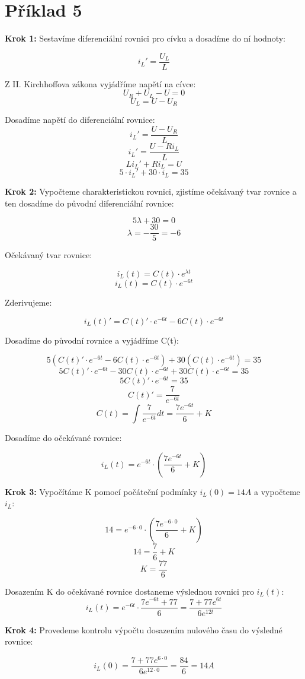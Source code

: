 \section{Příklad 5}

\textbf{Krok 1:} Sestavíme diferenciální rovnici pro cívku a dosadíme do ní hodnoty:

\[ i_{L}' = \frac{U_{L}}{L} \]

Z II. Kirchhoffova zákona vyjádříme napětí na cívce:
\[ U_{R} + U_{L} - U = 0 \]
\[ U_{L} = U - U_{R} \]

Dosadíme napětí do diferenciální rovnice:
\[ i_{L}' = \frac{U - U_{R}}{L} \]
\[ i_{L}' = \frac{U - R i_{L}}{L} \]
\[ L i_{L}' + R i_{L} = U \]
\[ 5 \cdot i_{L}' + 30 \cdot i_{L}  = 35 \]

\textbf{Krok 2:} Vypočteme charakteristickou rovnici, zjistíme očekávaný tvar rovnice a ten dosadíme do původní diferenciální rovnice:

\[ 5\lambda + 30 = 0 \]
\[ \lambda = -\frac{30}{5} = -6 \]

Očekávaný tvar rovnice:

\[ i_{L}(t) = C(t) \cdot e^{\lambda t} \]
\[ i_{L}(t) = C(t) \cdot e^{-6 t} \]

Zderivujeme:

\[ i_{L}(t)' = C(t)' \cdot e^{-6 t} - 6 C(t) \cdot e^{-6 t} \]

Dosadíme do původní rovnice a vyjádříme C(t):

\[ 5(C(t)' \cdot e^{-6 t} - 6 C(t) \cdot e^{-6 t}) + 30(C(t) \cdot e^{-6 t}) = 35 \]
\[ 5C(t)' \cdot e^{-6 t} - 30C(t) \cdot e^{-6 t} + 30C(t) \cdot e^{-6 t} = 35 \]
\[ 5C(t)' \cdot e^{-6 t} = 35 \]
\[ C(t)' = \frac{7}{e^{-6 t}} \]
\[ C(t) = \int \frac{7}{e^{-6 t}} dt = \frac{7e^{-6 t}}{6} + K\]

Dosadíme do očekávané rovnice:

\[ i_{L}(t) = e^{-6 t} \cdot \left(\frac{7e^{-6 t}}{6} + K \right)\]

\textbf{Krok 3:} Vypočítáme K pomocí počáteční podmínky \(i_{L}(0) = 14A\) a vypočteme \(i_{L}\): 

\[ 14 = e^{-6 \cdot 0} \cdot \left(\frac{7e^{-6 \cdot 0}}{6} + K \right) \]
\[ 14 = \frac{7}{6} + K \]
\[ K = \frac{77}{6} \]

Dosazením K do očekávané rovnice dostaneme výslednou rovnici pro \(i_{L}(t)\):
\[ i_{L}(t) = e^{-6 t} \cdot \frac{7e^{-6 t} + 77}{6} = \frac{7 + 77e^{6 t}}{6e^{12 t}}\]

\textbf{Krok 4:} Provedeme kontrolu výpočtu dosazením nulového času do výsledné rovnice:

\[ i_{L}(0) = \frac{7 + 77e^{6 \cdot 0}}{6e^{12 \cdot 0}} = \frac{84}{6} = 14 A\]